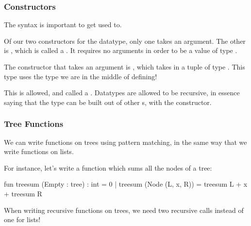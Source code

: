 \documentclass[aspectratio=169, handout]{beamer}
\begin{document}
\begin{frame}[fragile]
  \frametitle{Constructors}

  \rprs

  The syntax is important to get used to.

  \pause
  \vspace{\fill}

  Of our two constructors for the  datatype, only one takes an argument. The other is
  , which is called a . It requires no arguments in order
  to be a value of type .

  \pause
  \vspace{\fill}

  The constructor that takes an argument is , which takes in a tuple of type
  . This type uses the  type we are in the middle of defining!

  \pause
  \vspace{\fill}

  This is allowed, and called a . Datatypes are allowed to be recursive,
  in essence saying that the  type can be built out of other s, with the
   constructor.
\end{frame}

\begin{frame}[fragile]
  \frametitle{Tree Functions}

  We can write functions on trees using pattern matching, in the same way that we
  write functions on lists.

  \pause
  \vspace{\fill}

  For instance, let's write a function which sums all the nodes of a tree:

  \begin{codeblock}
    fun treesum (Empty : tree) : int = 0
      | treesum (Node (L, x, R)) = treesum L + x + treesum R
  \end{codeblock}

  \pause
  \vspace{\fill}

  When writing recursive functions on trees, we need two recursive calls instead of one
  for lists!
\end{frame}
\end{document}
